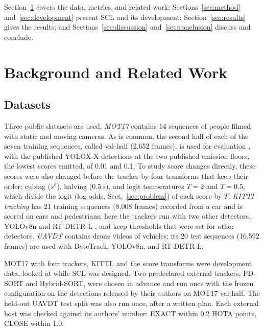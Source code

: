 \documentclass[pdflatex,sn-mathphys-num,iicol]{sn-jnl}
\newcommand{\scl}{SCL}
\begin{document}
Section~\ref{sec:related} covers the data, metrics, and related work;
Sections~\ref{sec:method} and~\ref{sec:development} present \scl{} and its development;
Section~\ref{sec:results} gives the results; and Sections~\ref{sec:discussion}
and~\ref{sec:conclusion} discuss and conclude.
\section{Background and Related Work}\label{sec:related}

\subsection{Datasets}\label{sec:data}
Three public datasets are used. \emph{MOT17} \cite{milan2016mot16} contains 14 sequences of
people filmed with static and moving cameras. As is common, the second half of each of the seven
training sequences, called val-half (2,652 frames), is used for evaluation \cite{zhang2022bytetrack},
with the published YOLOX-X detections \cite{ge2021yolox} at the two published emission floors, the
lowest scores emitted, of 0.01 and 0.1. To study score changes directly, these scores were also
changed before the tracker by four transforms that keep their order: cubing ($s^3$), halving
($0.5\,s$), and logit temperatures $T=2$ and $T=0.5$, which divide the logit (log-odds, Sect.~\ref{sec:problem}) of each score by $T$.
\emph{KITTI tracking} \cite{geiger2012kitti} has 21 training sequences (8,008 frames) recorded from
a car and is scored on cars and pedestrians; here the trackers run with two other detectors,
YOLOv8n \cite{jocher2023yolov8} and RT-DETR-L \cite{zhao2024rtdetr}, and keep thresholds that were
set for other detectors. \emph{UAVDT} \cite{du2018uavdt} contains drone videos of vehicles; its 20
test sequences (16,592 frames) are used with ByteTrack, YOLOv8n, and RT-DETR-L.

MOT17 with four trackers, KITTI, and the score transforms were development data, looked at while
\scl{} was designed. Two predeclared external trackers, PD-SORT and Hybrid-SORT, were chosen in
advance and run once with the frozen configuration on the detections released by their authors on
MOT17 val-half. The held-out UAVDT test split was also run once, after a written plan. Each
external host was checked against its authors' number: EXACT within 0.2 HOTA points, CLOSE within
1.0.
\end{document}
